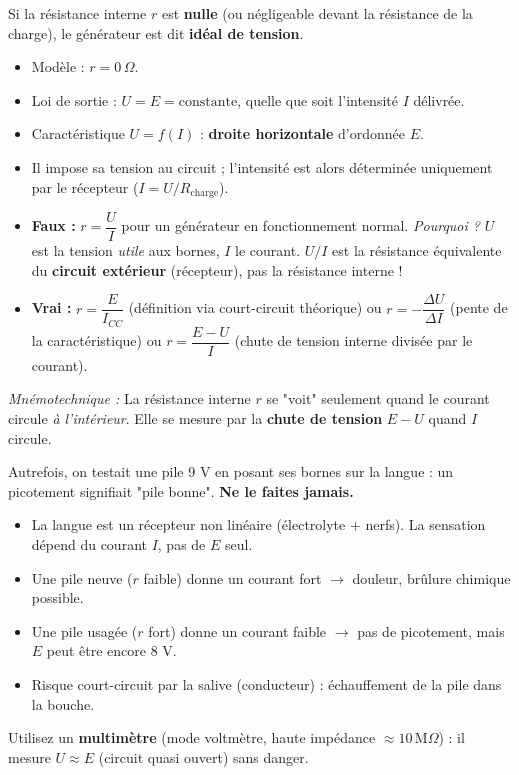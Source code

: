 \documentclass[11pt]{article}
\begin{document}
Si la résistance interne $r$ est \textbf{nulle} (ou négligeable devant la résistance de la charge), le générateur est dit \textbf{idéal de tension}.

\begin{propriete}
\begin{itemize}
    \item Modèle : $r = 0\,\Omega$.
    \item Loi de sortie : $\boxed{U = E = \text{constante}}$, quelle que soit l'intensité $I$ délivrée.
    \item Caractéristique $U = f(I)$ : \textbf{droite horizontale} d'ordonnée $E$.
    \item Il impose sa tension au circuit ; l'intensité est alors déterminée uniquement par le récepteur ($I = U/R_{\text{charge}}$).
\end{itemize}
\end{propriete}

\begin{attention}[Erreur fréquente : confusion $r = U/I$ vs $r = E/I_{CC}$]
\begin{itemize}
    \item \textbf{Faux :} $r = \dfrac{U}{I}$ pour un générateur en fonctionnement normal. \emph{Pourquoi ?} $U$ est la tension \emph{utile} aux bornes, $I$ le courant. $U/I$ est la résistance équivalente du \textbf{circuit extérieur} (récepteur), pas la résistance interne !
    \item \textbf{Vrai :} $r = \dfrac{E}{I_{CC}}$ (définition via court-circuit théorique) ou $r = -\dfrac{\Delta U}{\Delta I}$ (pente de la caractéristique) ou $r = \dfrac{E - U}{I}$ (chute de tension interne divisée par le courant).
\end{itemize}
\emph{Mnémotechnique :} La résistance interne $r$ se "voit" seulement quand le courant circule \emph{à l'intérieur}. Elle se mesure par la \textbf{chute de tension} $E-U$ quand $I$ circule.
\end{attention}

\begin{savaistu}
Autrefois, on testait une pile 9 V en posant ses bornes sur la langue : un picotement signifiait "pile bonne". \textbf{Ne le faites jamais.}
\begin{itemize}
    \item La langue est un récepteur non linéaire (électrolyte + nerfs). La sensation dépend du courant $I$, pas de $E$ seul.
    \item Une pile neuve ($r$ faible) donne un courant fort $\to$ douleur, brûlure chimique possible.
    \item Une pile usagée ($r$ fort) donne un courant faible $\to$ pas de picotement, mais $E$ peut être encore 8 V.
    \item Risque court-circuit par la salive (conducteur) : échauffement de la pile dans la bouche.
\end{itemize}
Utilisez un \textbf{multimètre} (mode voltmètre, haute impédance $\approx 10\,\text{M}\Omega$) : il mesure $U \approx E$ (circuit quasi ouvert) sans danger.
\end{savaistu}
\end{document}

